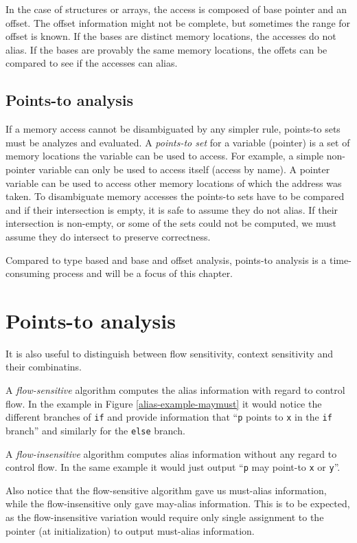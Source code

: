 In the case of structures or arrays, the access is composed of base pointer and
an offset. The offset information might not be complete, but sometimes the range
for offset is known. If the bases are distinct memory locations, the accesses do
not alias.  If the bases are provably the same memory locations, the offets can
be compared to see if the accesses can alias.

\subsection{Points-to analysis}

If a memory access cannot be disambiguated by any simpler rule, points-to sets
must be analyzes and evaluated. A {\it points-to set} for a variable (pointer)
is a set of memory locations the variable can be used to access. For example, a
simple non-pointer variable can only be used to access itself (access by name).
A pointer variable can be used to access other memory locations of which the
address was taken. To disambiguate memory accesses the points-to sets have to be
compared and if their intersection is empty, it is safe to assume they do not
alias. If their intersection is non-empty, or some of the sets could not be
computed, we must assume they do intersect to preserve correctness.

Compared to type based and base and offset analysis, points-to analysis is a
time-consuming process and will be a focus of this chapter.


\section{Points-to analysis}


It is also useful to distinguish between flow sensitivity, context sensitivity
and their combinatins.

A {\it flow-sensitive} algorithm computes the alias information with regard to control
flow. In the example in Figure \ref{alias-example-maymust} it would notice the
different branches of {\tt if} and provide information that ``{\tt p} points to
{\tt x} in the {\tt if} branch'' and similarly for the {\tt else} branch.

A {\it flow-insensitive} algorithm computes alias information without any regard
to control flow. In the same example it would just output ``{\tt p} may point-to
{\tt x} or {\tt y}''.

Also notice that the flow-sensitive algorithm gave us must-alias
information, while the flow-insensitive only gave may-alias information.
This is to be expected, as the flow-insensitive variation would require only
single assignment to the pointer (at initialization) to output must-alias
information.

